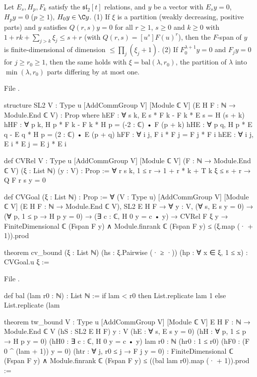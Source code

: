 \begin{theorem}\label{l26:thm:cv}
Let $E_s,H_p,F_k$ satisfy the $\mathfrak{sl}_2[t]$ relations, and $y$ be a vector with $E_sy=0$, $H_py=0$ ($p\ge1$),
$H_0y\in\C y$. (1) If $\xi$ is a partition (weakly decreasing, positive parts) and $y$ satisfies
$Q(r,s)y=0$ for all $r\ge1$, $s\ge0$ and $k\ge0$ with $1+rk+\sum_{j>k}\xi_j\le s+r$ (with $Q(r,s)=[u^s]F(u)^r$), then the $F$-span of $y$ is
finite-dimensional of dimension $\le\prod_j(\xi_j+1)$. (2) If $F_0^{\lambda+1}y=0$ and $F_jy=0$ for $j\ge r_0\ge1$, then
the same holds with $\xi=\mathrm{bal}(\lambda,r_0)$, the partition of $\lambda$ into $\min(\lambda,r_0)$ parts differing by at
most one.
\end{theorem}
\noindent File .
\begin{leancode}
structure SL2 {V : Type u} [AddCommGroup V] [Module ℂ V] (E H F : ℕ → Module.End ℂ V) : Prop where
  hEF : ∀ s k, E s * F k - F k * E s = H (s + k)
  hHF : ∀ p k, H p * F k - F k * H p = (-2 : ℂ) • F (p + k)
  hHE : ∀ p q, H p * E q - E q * H p = (2 : ℂ) • E (p + q)
  hFF : ∀ i j, F i * F j = F j * F i
  hEE : ∀ i j, E i * E j = E j * E i

def CVRel {V : Type u} [AddCommGroup V] [Module ℂ V] (F : ℕ → Module.End ℂ V) (ξ : List ℕ) (y : V) :
    Prop :=
  ∀ r s k, 1 ≤ r → 1 + r * k + T k ξ ≤ s + r → Q F r s y = 0

def CVGoal (ξ : List ℕ) : Prop :=
  ∀ (V : Type u) [AddCommGroup V] [Module ℂ V] (E H F : ℕ → Module.End ℂ V), SL2 E H F →
    ∀ y : V, (∀ s, E s y = 0) → (∀ p, 1 ≤ p → H p y = 0) → (∃ c : ℂ, H 0 y = c • y) →
      CVRel F ξ y → FiniteDimensional ℂ (Fspan F y) ∧
        Module.finrank ℂ (Fspan F y) ≤ (ξ.map (· + 1)).prod

theorem cv_bound (ξ : List ℕ) (hs : ξ.Pairwise (· ≥ ·)) (hp : ∀ x ∈ ξ, 1 ≤ x) : CVGoal.{u} ξ :=
\end{leancode}
\noindent File .
\begin{leancode}
def bal (lam r0 : ℕ) : List ℕ :=
  if lam < r0 then List.replicate lam 1
  else List.replicate (lam %

theorem tw_bound {V : Type u} [AddCommGroup V] [Module ℂ V] {E H F : ℕ → Module.End ℂ V}
    (hS : SL2 E H F) {y : V} (hE : ∀ s, E s y = 0) (hH : ∀ p, 1 ≤ p → H p y = 0)
    (hH0 : ∃ c : ℂ, H 0 y = c • y) {lam r0 : ℕ} (hr0 : 1 ≤ r0) (hF0 : (F 0 ^ (lam + 1)) y = 0)
    (htr : ∀ j, r0 ≤ j → F j y = 0) :
    FiniteDimensional ℂ (Fspan F y) ∧
      Module.finrank ℂ (Fspan F y) ≤ ((bal lam r0).map (· + 1)).prod :=
\end{leancode}

